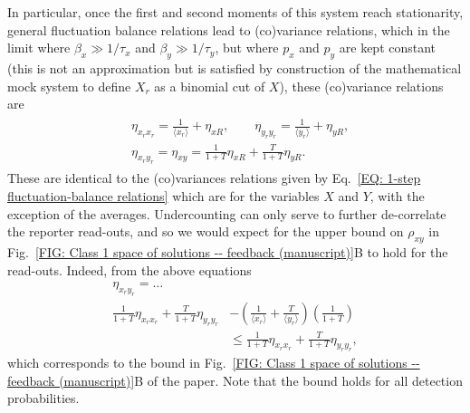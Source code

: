 \documentclass[%
 reprint,prx,
superscriptaddress,
%
%
%
%
%
%
%
%
%
 amsmath,amssymb,
 aps,
%
%
%
%
%
%
]{revtex4-2}
\begin{document}
{{In particular, once the first and second moments of this system reach stationarity, general fluctuation balance relations \cite{hilfinger2015a} lead to (co)variance relations, which in the limit where $\beta_x \gg 1/\tau_{x}$ and $\beta_{y} \gg 1/\tau_{y}$, but where $p_{x}$ and $p_{y}$ are kept constant (this is not an approximation but is satisfied by construction of the mathematical mock system to define $X_{r}$ as a binomial cut of $X$), these (co)variance relations are
\begin{align}
\begin{split}
        &\eta_{x_{r}x_{r}} = \frac{1}{\langle x_{r} \rangle} + \eta_{xR}, \qquad 
    \eta_{y_{r}y_{r}} = \frac{1}{\langle y_{r} \rangle} + \eta_{yR}, \\
    &\eta_{x_{r}y_{r}} = \eta_{xy} = \frac{1}{1+T}\eta_{xR} + \frac{T}{1+T}\eta_{yR} .
\end{split}
    \label{EQ: Undercounting-1step-covariance-relations}
\end{align}
These are identical to the (co)variances relations given by Eq.~\eqref{EQ: 1-step fluctuation-balance relations} which are for the variables $X$ and $Y$, with the exception of the averages. Undercounting can only serve to further de-correlate the reporter read-outs, and so we would expect for the upper bound on $\rho_{xy}$ in Fig.~\ref{FIG: Class 1 space of solutions -- feedback (manuscript)}B to hold for the read-outs. Indeed, from the above equations
\begin{align*}
    \eta_{x_{r}y_{r}} =\dots \qquad \qquad& \\\frac{1}{1+T}\eta_{x_{r}x_{r}} + \frac{T}{1+T}\eta_{y_{r}y_{r}} &- \left(\frac{1}{\langle x_{r} \rangle} + \frac{T}{\langle y_{r} \rangle}\right)\left(\frac{1}{1+T}\right) \\
    &\leq \frac{1}{1+T}\eta_{x_{r}x_{r}} + \frac{T}{1+T}\eta_{y_{r}y_{r}} ,
\end{align*}
which corresponds to the bound in Fig.~\ref{FIG: Class 1 space of solutions -- feedback (manuscript)}B of the paper. Note that the bound holds for all detection probabilities.

}}
\end{document}
